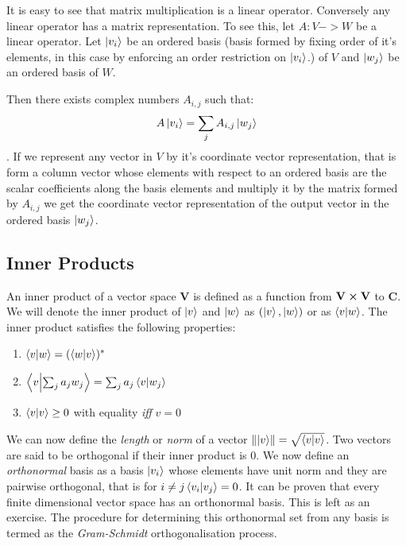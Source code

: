 It is easy to see that matrix multiplication is a linear operator. Conversely any linear operator has a matrix representation. To see this, let $A: V -> W$ be a linear operator. Let $\ket{v_{i}}$ be an ordered basis (basis formed by fixing order of it's elements, in this case by enforcing an order restriction on $\ket{v_{i}}$.) of $V$ and $\ket{w_{j}}$ be an ordered basis of $W$.

Then there exists complex numbers $A_{i,j}$ such that: $$A\ket{v_{i}} = \sum_{j} A_{i,j}\ket{w_{j}}$$.
If we represent any vector in $V$ by it's coordinate vector representation, that is form a column vector whose elements with respect to an ordered basis are the scalar coefficients along the basis elements  and multiply it by the matrix formed by $A_{i,j}$ we get the coordinate vector representation of the output vector in the ordered basis $\ket{w_{j}}$.

\subsection{Inner Products}
An inner product of a vector space \textbf{V} is defined as a function from $\textbf{V} \cross \textbf{V}$ to $\textbf{C}$. We will denote the inner product of $\ket{v}$ and $\ket{w}$ as $(\ket{v}, \ket{w})$ or as $\braket{v}{w}$. The inner product satisfies the following properties:
\begin{enumerate}
    \item $\braket{v}{w} = ({\braket{w}{v}})^{*}$
    \item $\braket{v}{\sum_{j} a_{j}w_{j}} = \sum_{j} a_{j} \braket{v}{w_{j}}$
    \item $\braket{v}{v} \geq 0 $ with equality \textit{iff} $v=0$
\end{enumerate}
We can now define the \textit{length} or \textit{norm} of a vector 
$\norm{\ket{v}} = \sqrt{\braket{v}{v}}$. 
Two vectors are said to be orthogonal if their inner product is $0$. 
We now define an \textit{orthonormal} basis as a basis $\ket{v_{i}}$ whose elements have unit norm and they are pairwise orthogonal, that is for $i\neq j \braket{v_i}{v_j} = 0$.
It can be proven that every finite dimensional vector space has an orthonormal basis. This is left as an exercise. The procedure for determining this orthonormal set from any basis is termed as the \textit{Gram-Schmidt} orthogonalisation process.


